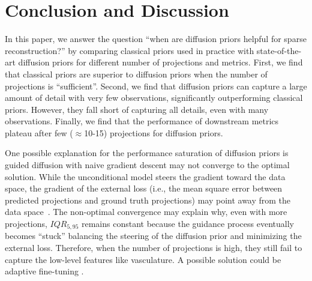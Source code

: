 \section{Conclusion and Discussion}
In this paper, we answer the question ``when are diffusion priors helpful for sparse reconstruction?'' by comparing classical priors used in practice with state-of-the-art diffusion priors for different number of projections and metrics.
First, we find that classical priors are superior to diffusion priors when the number of projections is ``sufficient''.
Second, we find that diffusion priors can capture a large amount of detail with very few observations, significantly outperforming classical priors. 
However, they fall short of capturing all details, even with many observations.
Finally, we find that the performance of downstream metrics plateau after few ($\approx$10-15) projections for diffusion priors.

One possible explanation for the performance saturation of diffusion priors is guided diffusion with naive gradient descent may not converge to the optimal solution.
While the unconditional model steers the gradient toward the data space, the gradient of the external loss (i.e., the mean square error between predicted projections and ground truth projections) may point away from the data space~\cite{guo2024gradient}.
The non-optimal convergence may explain why, even with more projections, $IQR_{5,95}$ remains constant because the guidance process eventually becomes ``stuck'' balancing the steering of the diffusion prior and minimizing the external loss.
Therefore, when the number of projections is high, they still fail to capture the low-level features like vasculature.
A possible solution could be adaptive fine-tuning \cite{guo2024gradient}.

